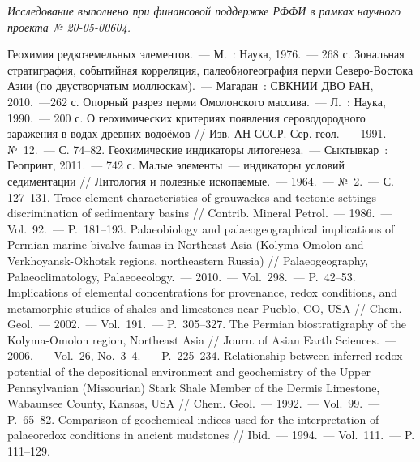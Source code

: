 \textit{Исследование выполнено при финансовой поддержке РФФИ в рамках научного проекта № 20-05-00604.}


\begin{thebibliography}{99}
\bibitem{} Геохимия редкоземельных элементов.~--- М.~: Наука, 1976.~--- 268 с.
\bibitem{} Зональная стратиграфия, событийная корреляция, палеобиогеография перми Северо-Востока Азии (по двустворчатым моллюскам).~--- Магадан~: СВКНИИ ДВО РАН, 2010.~---262 с.
\bibitem{} Опорный разрез перми Омолонского массива.~--- Л.~: Наука, 1990.~--- 200 с.
\bibitem{} О геохимических критериях появления сероводородного заражения в водах древних водоёмов // Изв. АН СССР. Сер. геол.~--- 1991.~--- №~12.~--- С. 74--82.
\bibitem{} Геохимические индикаторы литогенеза.~--- Сыктывкар~: Геопринт, 2011.~--- 742 с.
\bibitem{} Малые элементы~--- индикаторы условий седиментации // Литология и полезные ископаемые.~--- 1964.~--- №~2.~--- С. 127--131.
\bibitem{} Trace element characteristics of grauwackes and tectonic settings discrimination of sedimentary basins // Contrib. Mineral Petrol.~--- 1986.~--- Vol.~92.~--- P.~181--193.
\bibitem{} Palaeobiology and palaeogeographical implications of Permian marine bivalve faunas in Northeast Asia (Kolyma-Omolon and Verkhoyansk-Okhotsk regions, northeastern Russia) // Palaeogeography, Palaeoclimatology, Palaeoecology.~--- 2010.~--- Vol.~298.~--- P.~42--53.
\bibitem{} Implications of elemental concentrations for provenance, redox conditions, and metamorphic studies of shales and limestones near Pueblo, CO, USA // Chem. Geol.~--- 2002.~--- Vol.~191.~--- P.~305--327.
\bibitem{} The Permian biostratigraphy of the Kolyma-Omolon region, Northeast Asia // Journ. of Asian Earth Sciences.~--- 2006.~--- Vol.~26, No.~3--4.~--- P.~225--234.
\bibitem{} Relationship between inferred redox potential of the depositional environment and geochemistry of the Upper Pennsylvanian (Missourian) Stark Shale Member of the Dermis Limestone, Wabaunsee County, Kansas, USA // Chem. Geol.~--- 1992.~--- Vol.~99.~--- P.~65--82.
\bibitem{} Comparison of geochemical indices used for the interpretation of palaeoredox conditions in ancient mudstones // Ibid.~--- 1994.~--- Vol.~111.~--- P. 111--129.

\end{thebibliography}
